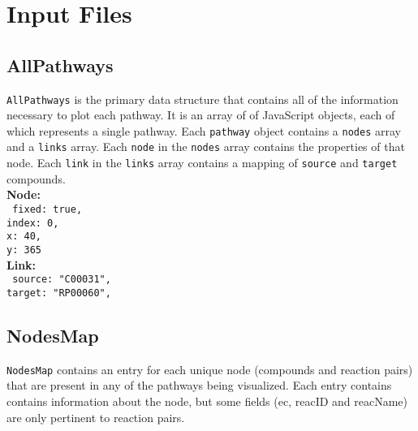 \documentclass{article}
\begin{document}



	\section{Input Files} %
		\label{sub:input_files}

			\subsection{AllPathways}
			\texttt{AllPathways} is the primary data structure that contains
			all of the information necessary to plot each pathway. It is an
			array of of JavaScript objects, each of which represents a single
			pathway. Each \texttt{pathway} object contains a \texttt{nodes}
			array and a \texttt{links} array. Each \texttt{node} in the
			\texttt{nodes} array contains the properties of that node. Each
			\texttt{link} in the \texttt{links} array contains a mapping of
			\texttt{source} and \texttt{target} compounds.\\

			\noindent \textbf{Node:}\\
				\texttt{
					\indent fixed: 	true,\\
					\indent index:	0,\\
					\indent x:	40,\\
					\indent y:	365\\
				}
			\noindent \textbf{Link:}\\
				\texttt{
					\indent source: "C00031",\\
					\indent target:	"RP00060",\\
				}

			\subsection{NodesMap}
			\texttt{NodesMap} contains an entry for each unique node
			(compounds and reaction pairs) that are present in any of the
			pathways being visualized. Each entry contains contains information
			about the node, but some fields (ec, reacID and reacName) are only
			pertinent to reaction pairs.\\
\end{document}
